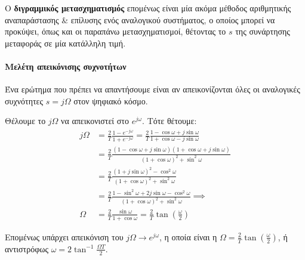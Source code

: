 \documentclass[11pt,a4paper,notitlepage,fleqn]{article}
\begin{document}
Ο \textbf{διγραμμικός μετασχηματισμός} επομένως είναι μία ακόμα μέθοδος αριθμητικής αναπαράστασης \&
επίλυσης ενός αναλογικού συστήματος, ο οποίος μπορεί να προκύψει, όπως και οι παραπάνω μετασχηματισμοί,
θέτοντας το \( s \) της συνάρτησης μεταφοράς σε μία κατάλληλη τιμή.

\paragraph{Μελέτη απεικόνισης συχνοτήτων}
Ένα ερώτημα που πρέπει να απαντήσουμε είναι αν απεικονίζονται όλες οι αναλογικές συχνότητες \( s=jΩ \)
στον ψηφιακό κόσμο.

Θέλουμε το \( j\Omega \) να απεικονιστεί στο \( e^{j\omega} \). Τότε θέτουμε:
\begin{align*}
	jΩ &= \frac{2}{T} \frac{1-e^{-j\omega }}{1+e^{-j\omega }} = \frac{2}{T} \frac{1-\cos \omega +j\sin \omega}{1+\cos \omega - j \sin \omega}
	\\ &= \frac{2}{T} \frac{
	(1-\cos \omega + j\sin \omega)(1+\cos \omega + j \sin \omega)
    }{(1+\cos \omega)^2 + \sin^2 \omega}
    \\ &= \frac{2}{Τ} \frac{(1+j\sin \omega)^2 - \cos^2\omega}{(1+\cos\omega)^2 + \sin^2\omega}
    \\ &= \frac{2}{T} \frac{1-\sin^2\omega + 2j\sin\omega - \cos^2\omega}{(1+\cos\omega)^2 + \sin^2\omega} \implies
    \\ \Omega &= \frac{2}{T} \frac{\sin\omega}{1+\cos \omega} = \frac{2}{T} \tan\left(\frac{\omega}{2}\right)
\end{align*}

Επομένως υπάρχει απεικόνιση του \( j\Omega \to e^{j\omega} \), η οποία είναι η \( \Omega = \frac{2}{T}\tan\left(\frac{\omega}{2}\right) \), ή αντιστρόφως \( \omega = 2\tan^{-1}\frac{\Omega T}{2} \).

\begin{center}
\end{center}
\end{document}
